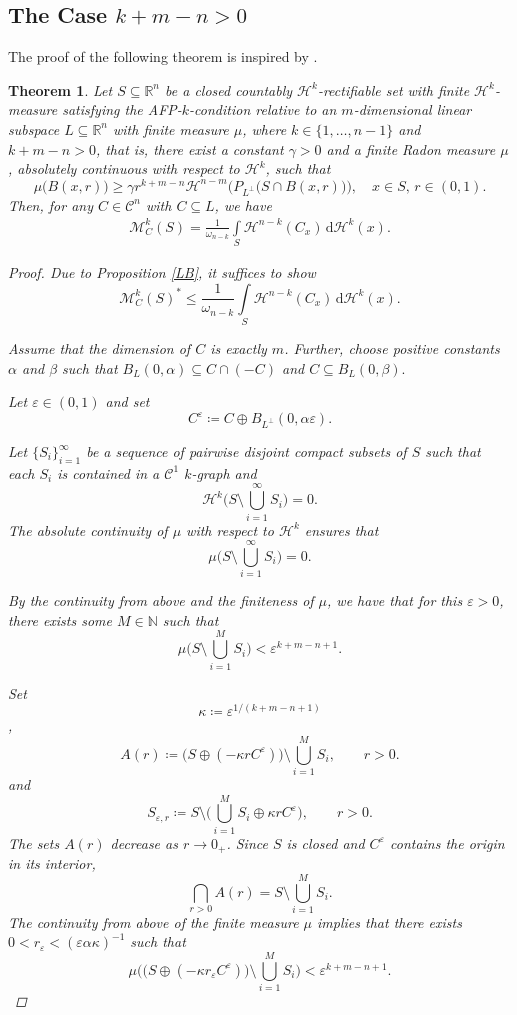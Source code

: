 \documentclass[pdflatex,sn-mathphys-num]{sn-jnl}
\theoremstyle{plain}
\newtheorem{theorem}{Theorem}[section]
\theoremstyle{definition}
\newcommand{\dH}[1]{\,\mathrm d\mathcal{H}^{#1}}
\begin{document}
\subsection{The Case $k+m-n>0$}
The proof of the following theorem is inspired by \cite[Theorem 8]{Rataj5}.
\begin{theorem}
        Let $S\subseteq\mathbb{R}^n$ be a closed countably $\mathcal{H}^k$-rectifiable set with finite $\mathcal{H}^k$-measure satisfying the AFP-$k$-condition relative to an $m$-dimensional linear subspace $L\subseteq\mathbb{R}^n$ with finite measure $\mu$, where $k\in\{1, \dots, n-1\}$ and $k+m-n>0$, that is, there exist a constant $\gamma>0$ and a finite Radon measure $\mu$, absolutely continuous with respect to $\mathcal{H}^k$, such that $$\mu\big(B(x, r)\big)\geq\gamma r^{k+m-n}\mathcal{H}^{n-m}\Big(P_{L^{\perp}}\big(S\cap B(x, r)\big)\Big),\quad\text{$x\in S$, $r\in (0, 1)$.}$$ Then, for any $C\in\mathcal{C}^n$ with $C\subseteq L$, we have \begin{align*}
            \mathcal{M}^k_{C}(S)=\frac{1}{\omega_{n-k}}
            \int\limits_{S}\mathcal{H}^{n-k}(C_x)\dH{k}(x).
        \end{align*}
        \begin{proof}
            Due to Proposition \ref{LB}, it suffices to show $$\mathcal{M}^k_{C}(S)^*\leq\frac{1}{\omega_{n-k}}
            \int\limits_{S}\mathcal{H}^{n-k}(C_x)\dH{k}(x).$$
            
            Assume that the dimension of $C$ is exactly $m$. Further, choose positive constants $\alpha$ and $\beta$ such that $B_L(0, \alpha)\subseteq C\cap (-C)$ and $C\subseteq B_L(0, \beta).$

            Let $\varepsilon\in (0, 1)$ and set $$C^{\varepsilon}\coloneq C\oplus B_{L^{\perp}}(0, \alpha\varepsilon).$$

            Let $\{S_i\}_{i=1}^{\infty}$ be a sequence of pairwise disjoint compact
subsets of $S$ such that each $S_i$ is contained in a $\mathcal C^1$
$k$-graph and
\[
\mathcal H^k\Big(S\setminus\bigcup_{i=1}^{\infty}S_i\Big)=0.
\]
The absolute continuity of $\mu$ with respect to $\mathcal{H}^k$ ensures that
\[
\mu\Big(S\setminus\bigcup_{i=1}^{\infty}S_i\Big)=0.
\] 

By the continuity from above and the finiteness of $\mu$, we have that for this $\varepsilon>0$, there exists some $M\in\mathbb{N}$ such that $$\mu\Big(S\setminus\bigcup_{i=1}^{M}S_i\Big)<\varepsilon^{k+m-n+1}.$$

Set $$\kappa\coloneqq\varepsilon^{1/(k+m-n+1)}$$, 
\[
A(r)\coloneqq
\bigl(S\oplus(-\kappa rC^\varepsilon)\bigr)
\setminus\bigcup_{i=1}^M S_i, \qquad r>0.
\] and $$S_{\varepsilon, r}\coloneq S\setminus \Big(\bigcup_{i=1}^{M}S_i\oplus \kappa rC^{\varepsilon}\Big),\qquad r>0.$$ The sets \(A(r)\) decrease as \(r\to0_+\). Since \(S\) is closed and
\(C^\varepsilon\) contains the origin in its interior,
\[
\bigcap_{r>0}A(r)
=
S\setminus\bigcup_{i=1}^M S_i.
\] The continuity from above
of the finite measure \(\mu\) implies that there exists $0<r_{\varepsilon}<(\varepsilon\alpha\kappa)^{-1}$ such that $$\mu\Big(\big(S\oplus (-\kappa r_{\varepsilon}C^{\varepsilon})\big)\setminus \bigcup_{i=1}^M S_i\Big)<\varepsilon^{k+m-n+1}.$$ 


\end{proof}
\end{theorem}
\end{document}

